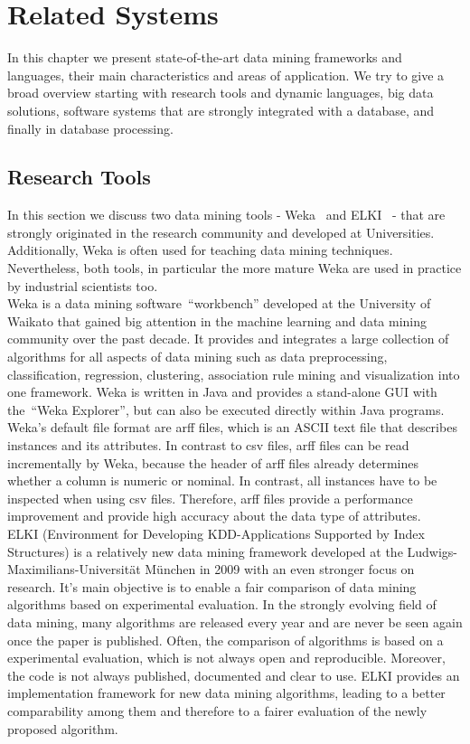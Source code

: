 \chapter{Related Systems}\label{chapter:related}

In this chapter we present state-of-the-art data mining frameworks and languages, their main characteristics and areas of application. We try to give a broad overview starting with research tools and dynamic languages, big data solutions, software systems that are strongly integrated with a database, and finally in database processing.

\section{Research Tools}
In this section we discuss two data mining tools - Weka~\parencite{Hall:2009:WDM:1656274.1656278} and ELKI~\parencite{DBLP:conf/ssdbm/AchtertKZ08} - that are strongly originated in the research community and developed at Universities. Additionally, Weka is often used for teaching data mining techniques. Nevertheless, both tools, in particular the more mature Weka are used in practice by industrial scientists too.
\\
Weka is a data mining software~\enquote{workbench} developed at the University of Waikato that gained big attention in the machine learning and data mining community over the past decade. It provides and integrates a large collection of algorithms for all aspects of data mining such as data preprocessing, classification, regression, clustering, association rule mining and visualization into one framework. Weka is written in Java and provides a stand-alone GUI with the~\enquote{Weka Explorer}, but can also be executed directly within Java programs. 
\\
Weka's default file format are arff files, which is an ASCII text file that describes instances and its attributes. In contrast to csv files, arff files can be read incrementally by Weka, because the header of arff files already determines whether a column is numeric or nominal. In contrast, all instances have to be inspected when using csv files. Therefore, arff files provide a performance improvement and provide high accuracy about the data type of attributes.
\\
ELKI (Environment for Developing KDD-Applications Supported by Index Structures) is a relatively new data mining framework developed at the Ludwigs-Maximilians-Universität München in 2009 with an even stronger focus on research. It's main objective is to enable a fair comparison of data mining algorithms based on experimental evaluation. In the strongly evolving field of data mining, many algorithms are released every year and are never be seen again once the paper is published. Often, the comparison of algorithms is based on a experimental evaluation, which is not always open and reproducible. Moreover, the code is not always published, documented and clear to use. ELKI provides an implementation framework for new data mining algorithms, leading to a better comparability among them and therefore to a fairer evaluation of the newly proposed algorithm. 
